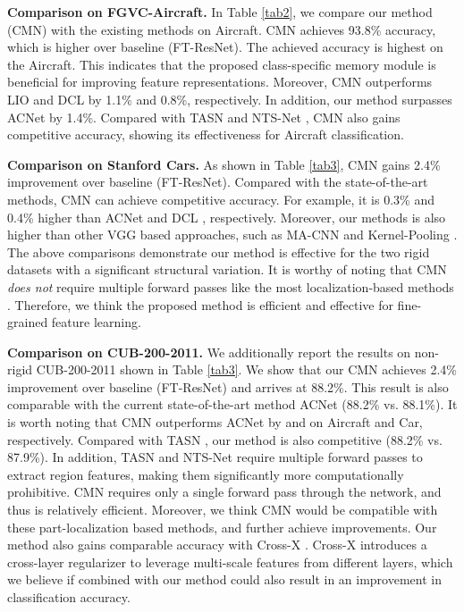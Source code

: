 \documentclass[journal]{IEEEtran}
\begin{document}
\textbf{Comparison on FGVC-Aircraft.} In Table \ref{tab2}, we compare our method (CMN) with the existing methods on Aircraft. CMN achieves 93.8\% accuracy, which is  higher over baseline (FT-ResNet). The achieved accuracy is highest on the Aircraft. This indicates that the proposed class-specific memory module is beneficial for improving feature representations. Moreover, CMN outperforms LIO \cite{Zhou_2020_CVPR} and DCL \cite{Chen_2019_CVPR} by 1.1\% and 0.8\%, respectively. In addition, our method surpasses ACNet \cite{ji2020attention} by 1.4\%. Compared with TASN \cite{zheng2019looking} and NTS-Net \cite{yang2018learning}, CMN also gains competitive accuracy, showing its effectiveness for Aircraft classification.

\textbf{Comparison on Stanford Cars.} As shown in Table \ref{tab3}, CMN gains 2.4\% improvement over baseline (FT-ResNet). Compared with the state-of-the-art methods, CMN can achieve competitive accuracy. For example, it is 0.3\% and 0.4\% higher than ACNet \cite{ji2020attention} and DCL \cite{wang2018learning}, respectively. 
Moreover, our methods is also higher than other VGG based approaches, such as MA-CNN \cite{zheng2017learning} and Kernel-Pooling \cite{cui2017kernel}.
The above comparisons demonstrate our method is effective for the two rigid datasets with a significant structural variation. It is worthy of noting that CMN \emph{does not} require multiple forward passes like the most localization-based methods \cite{yang2018learning,zheng2019looking}. Therefore, we think the proposed method is efficient and effective for fine-grained feature learning.

\textbf{Comparison on CUB-200-2011.} We additionally report the results on non-rigid CUB-200-2011 shown in Table \ref{tab3}. We show that our CMN achieves 2.4\% improvement over baseline (FT-ResNet) and arrives at 88.2\%. This result is also comparable with the current state-of-the-art method ACNet \cite{ji2020attention} (88.2\% vs. 88.1\%). It is worth noting that CMN outperforms ACNet by  and  on Aircraft and Car, respectively.
Compared with TASN \cite{zheng2019looking}, our method is also competitive (88.2\% vs. 87.9\%). In addition, TASN and NTS-Net \cite{yang2018learning} require multiple forward passes to extract region features, making them significantly more computationally prohibitive. CMN requires only a single forward pass through the network, and thus is relatively efficient. Moreover, we think CMN would be compatible with these part-localization based methods, and further achieve improvements.
Our method also gains comparable accuracy with Cross-X \cite{luo2019cross}. Cross-X introduces a cross-layer regularizer to leverage multi-scale features from different layers, which we believe if combined with our method could also result in an improvement in classification accuracy.
\end{document}

